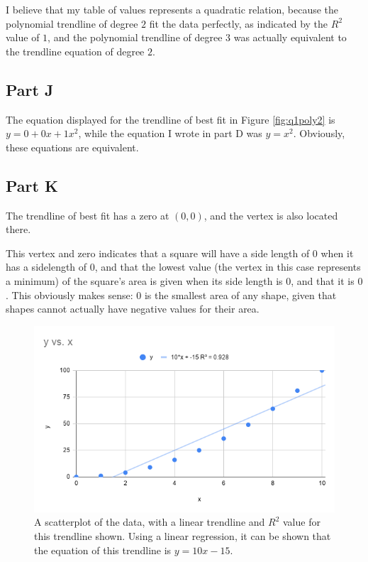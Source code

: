 \documentclass[12pt]{article}
\begin{document}
I believe that my table of values represents a quadratic relation, because the polynomial trendline of degree $2$ fit the data perfectly, as indicated by the $R^2$ value of $1$, and the polynomial trendline of degree $3$ was actually equivalent to the trendline equation of degree $2$.

\subsection{Part J}

The equation displayed for the trendline of best fit in Figure \ref{fig:q1poly2} is $y = 0 + 0x + 1x^2$, while the equation I wrote in part D was $y=x^2$. Obviously, these equations are equivalent.

\subsection{Part K}

The trendline of best fit has a zero at $(0,0)$, and the vertex is also located there.

This vertex and zero indicates that a square will have a side length of $0$ when it has a sidelength of $0$, and that the lowest value (the vertex in this case represents a minimum) of the square's area is given when its side length is $0$, and that it is $0$. This obviously makes sense: $0$ is the smallest area of any shape, given that shapes cannot actually have negative values for their area.

\begin{figure}[p]
\includegraphics[width=6.5in]{q1graph.png}
\caption{A scatterplot of the data, with a linear trendline and $R^2$ value for this trendline shown. Using a linear regression, it can be shown that the equation of this trendline is $y=10x - 15$.}
\label{fig:q1linear}
\end{figure}
\end{document}
